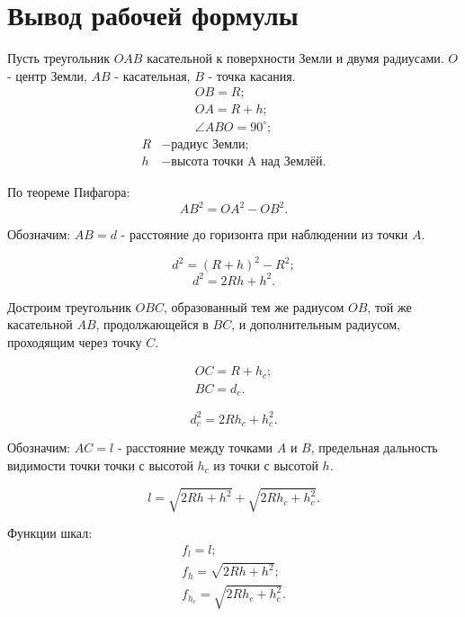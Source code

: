 \section{Вывод рабочей формулы}

Пусть треугольник $OAB$ касательной к поверхности Земли и двумя радиусами. $O$ - центр Земли, $AB$ - касательная, $B$ - точка касания.
\begin{eqnarray}
OB = R;\\
OA = R+h;\\
\angle ABO = 90^\circ;
\end{eqnarray}
\begin{align*}
R & - \text{радиус Земли};\\
h & - \text{высота точки A над Землёй}.
\end{align*}

По теореме Пифагора:
\begin{equation}
AB^2 = OA^2 - OB^2.
\end{equation}

Обозначим: $AB = d$ - расстояние до горизонта при наблюдении из точки $A$.

$$d^2 = (R+h)^2 - R^2;$$
\begin{equation}
	d^2 = 2Rh + h^2.
\end{equation}

Достроим треугольник $OBC$, образованный тем же радиусом $OB$, той же касательной $AB$, продолжающейся в $BC$, и дополнительным радиусом, проходящим через точку $C$.

\begin{eqnarray*}
OC = R+h_c;\\
BC = d_c.
\end{eqnarray*}

\begin{equation}
	d_c^2 = 2Rh_c + h_c^2.
\end{equation}

Обозначим: $AC = l$ - расстояние между точками $A$ и $B$, предельная дальность видимости точки точки с высотой $h_c$ из точки с высотой $h$.

\begin{equation}
	l = \sqrt{2Rh + h^2} + \sqrt{2Rh_c + h_c^2}.
\end{equation}

Функции шкал:
\begin{eqnarray}
	f_l = l;\\
	f_h = \sqrt{2Rh + h^2};\\
	f_{h_c} = \sqrt{2Rh_c + h_c^2}.
\end{eqnarray}

